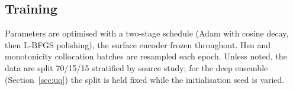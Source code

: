 \subsection{Training}

Parameters are optimised with a two-stage schedule (Adam with cosine decay,
then L-BFGS polishing), the surface encoder frozen throughout. Hsu and
monotonicity collocation batches are resampled each epoch. Unless noted, the
data are split 70/15/15 stratified by source study; for the deep ensemble
(Section~\ref{sec:uq}) the split is held fixed while the initialisation seed is
varied.

